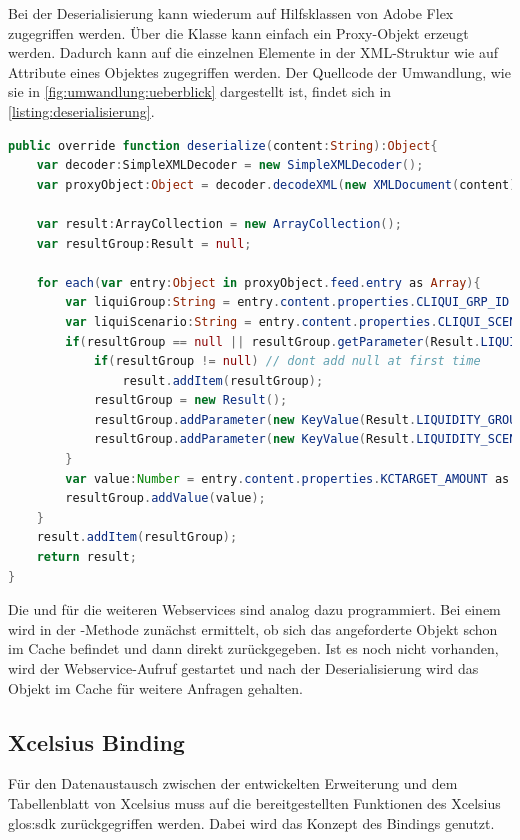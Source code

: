 \begin{onehalfspacing}
Bei der Deserialisierung kann wiederum auf Hilfsklassen von Adobe Flex zugegriffen werden. Über die Klasse  kann einfach ein Proxy-Objekt erzeugt werden. Dadurch kann auf die einzelnen Elemente in der \gls{XML}-Struktur wie auf Attribute eines Objektes zugegriffen werden. Der Quellcode der Umwandlung, wie sie in \vref{fig:umwandlung:ueberblick} dargestellt ist, findet sich in \vref{listing:deserialisierung}.


\begin{programm}[htbp]
\begin{lstlisting}[language=ActionScript]
public override function deserialize(content:String):Object{			
	var decoder:SimpleXMLDecoder = new SimpleXMLDecoder();
	var proxyObject:Object = decoder.decodeXML(new XMLDocument(content));
	
	var result:ArrayCollection = new ArrayCollection();
	var resultGroup:Result = null;			
			
	for each(var entry:Object in proxyObject.feed.entry as Array){
		var liquiGroup:String = entry.content.properties.CLIQUI_GRP_ID as String;
		var liquiScenario:String = entry.content.properties.CLIQUI_SCENARIO as String;
		if(resultGroup == null || resultGroup.getParameter(Result.LIQUIDITY_GROUP) != liquiGroup || resultGroup.getParameter(Result.LIQUIDITY_SCENARIO) != liquiScenario){
			if(resultGroup != null) // dont add null at first time
				result.addItem(resultGroup);
			resultGroup = new Result();
			resultGroup.addParameter(new KeyValue(Result.LIQUIDITY_GROUP,liquiGroup));
			resultGroup.addParameter(new KeyValue(Result.LIQUIDITY_SCENARIO,liquiScenario));
		}
		var value:Number = entry.content.properties.KCTARGET_AMOUNT as Number;
		resultGroup.addValue(value);
	}
	result.addItem(resultGroup);
	return result;
}
\end{lstlisting}
\caption{Deserialisierung des XML-Format in die interne Objektstruktur\label{listing:deserialisierung}}
\end{programm}


Die  und  für die weiteren Webservices sind analog dazu programmiert. Bei einem  wird in der -Methode zunächst ermittelt, ob sich das angeforderte Objekt schon im Cache befindet und dann direkt zurückgegeben. Ist es noch nicht vorhanden, wird der Webservice-Aufruf gestartet und nach der Deserialisierung wird das Objekt im Cache für weitere Anfragen gehalten.

\subsection{\gls{Xcelsius} Binding}
\label{sec:xcelsius_binding}
Für den Datenaustausch zwischen der entwickelten Erweiterung und dem Tabellenblatt von \gls{Xcelsius} muss auf die bereitgestellten Funktionen des \gls{Xcelsius} \gls{glos:sdk} zurückgegriffen werden. Dabei wird das Konzept des Bindings genutzt.


\end{onehalfspacing}
